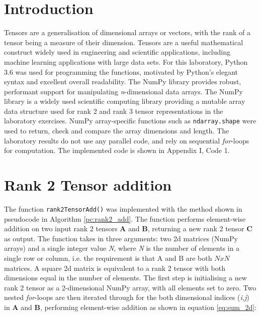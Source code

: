 \documentclass[10 pt, conference]{cssconf}
\begin{document}
\section{Introduction}
Tensors are a generalisation of dimensional arrays or vectors, with the rank of a tensor being a measure of their dimension. Tensors are a useful mathematical construct widely used in engineering and scientific applications, including machine learning applications with large data sets. For this laboratory, Python 3.6 was used for programming the functions, motivated by Python's elegant syntax and excellent overall readability. The NumPy library provides robust, performant support for manipulating \textit{n}-dimensional data arrays. The NumPy library is a widely used scientific computing library providing a mutable array data structure used for rank 2 and rank 3 tensor representations in the laboratory exercises. NumPy array-specific functions such as \verb|ndarray.shape| were used to return, check and compare the array dimensions and length. The laboratory results do not use any parallel code, and rely on sequential \textit{for}-loops for computation. The implemented code is shown in Appendix I, Code 1.%


\section{Rank 2 Tensor addition}
The function \verb|rank2TensorAdd()| was implemented with the method shown in pseudocode in Algorithm \ref{pc:rank2_add}. The function performs element-wise addition on two input rank 2 tensors $\mathbf{A}$ and $\mathbf{B}$, returning a new rank 2 tensor $\mathbf{C}$ as output. The function takes in three arguments: two 2d matrices (NumPy arrays) and a single integer value \textit{N}, where \textit{N} is the number of elements in a single row or column, i.e. the requirement is that A and B are both $NxN$ matrices. A square 2d matrix is equivalent to a rank 2 tensor with both dimensions equal in the number of elements. The first step is initialising a new rank 2 tensor as a 2-dimensional NumPy array, with all elements set to zero. Two nested \textit{for}-loops are then iterated through for the both dimensional indices (\textit{i,j}) in $\mathbf{A}$ and $\mathbf{B}$, performing element-wise addition as shown in equation \ref{eq:sum_2d}:
\end{document}
